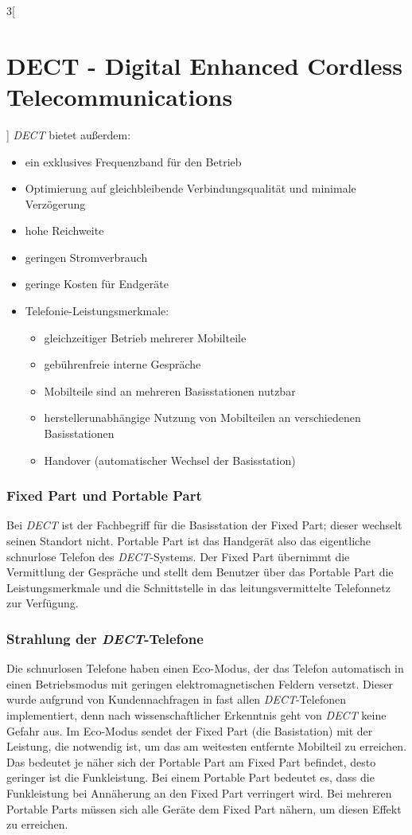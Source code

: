 \begin{multicols}{3}[\section{DECT - Digital Enhanced Cordless Telecommunications}]
\textit{DECT} bietet außerdem:
\begin{itemize}
	\item  ein exklusives Frequenzband für den Betrieb
	\item Optimierung auf gleichbleibende Verbindungsqualität und minimale Verzögerung
	\item hohe Reichweite
	\item geringen Stromverbrauch
	\item geringe Kosten für Endgeräte
	\item Telefonie-Leistungsmerkmale:
	\begin{itemize}
		\item gleichzeitiger Betrieb mehrerer Mobilteile
		\item gebührenfreie interne Gespräche
		\item Mobilteile sind an mehreren Basisstationen nutzbar
		\item herstellerunabhängige Nutzung von Mobilteilen an verschiedenen Basisstationen
		\item Handover (automatischer Wechsel der Basisstation)
	\end{itemize}
\end{itemize}
\cite{dect.1}

\subsubsection*{Fixed Part und Portable Part}
Bei \textit{DECT} ist der Fachbegriff für die  Basisstation der Fixed Part; dieser wechselt seinen Standort nicht. Portable Part ist das Handgerät also das eigentliche schnurlose Telefon des \textit{DECT}-Systems. 
Der Fixed Part übernimmt die Vermittlung der Gespräche und stellt dem Benutzer über das Portable Part die Leistungsmerkmale und die Schnittstelle in das leitungsvermittelte Telefonnetz zur Verfügung. \cite{dect.1}

\subsubsection*{Strahlung der \textit{DECT}-Telefone}
Die schnurlosen Telefone haben einen Eco-Modus, der das Telefon automatisch in einen Betriebsmodus mit geringen elektromagnetischen Feldern versetzt. Dieser wurde aufgrund von Kundennachfragen in fast allen \textit{DECT}-Telefonen implementiert, denn nach wissenschaftlicher Erkenntnis geht von \textit{DECT} keine Gefahr aus.
Im Eco-Modus sendet der Fixed Part (die Basistation) mit der Leistung, die notwendig ist, um das am weitesten entfernte Mobilteil zu erreichen. Das bedeutet je näher sich der Portable Part am Fixed Part befindet, desto geringer ist die Funkleistung. Bei einem Portable Part bedeutet es, dass die Funkleistung bei Annäherung an den Fixed Part verringert wird. Bei mehreren Portable Parts müssen sich alle Geräte dem Fixed Part nähern, um diesen Effekt zu erreichen. \cite{dect.1}


\end{multicols}
